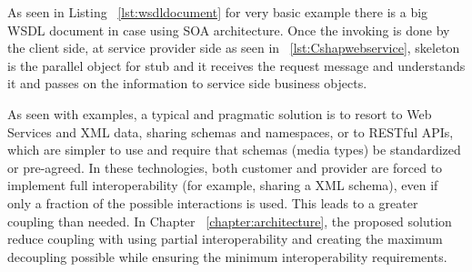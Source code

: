 As seen in Listing ~\ref{lst:wsdldocument} for very basic example there is a big WSDL document in case using SOA architecture. Once the invoking is done by the client side, at service provider side as seen in ~\ref{lst:Cshapwebservice}, skeleton is the parallel object for stub and it receives the request message and understands it and passes on the information to service side business objects.


As seen with examples, a typical and pragmatic solution is to resort to Web Services and XML data, sharing schemas and namespaces, or to RESTful APIs, which are simpler to use and require that schemas (media types) be standardized or pre-agreed. In these technologies, both customer and provider are forced to implement full interoperability (for example, sharing a XML schema), even if only a fraction of the possible interactions is used. This leads to a greater coupling than needed. In Chapter ~\ref{chapter:architecture}, the proposed solution  reduce coupling with using partial interoperability and creating the maximum decoupling possible while ensuring the minimum interoperability requirements.

